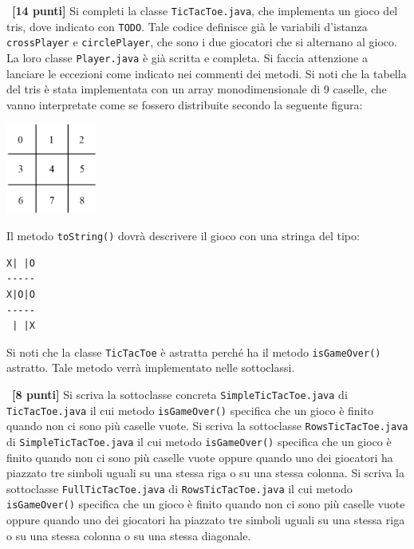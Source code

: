 \documentclass[12pt]{article}
\newcounter{esnu}
\newenvironment{esercizio}{\medskip \noindent {\bf Esercizio\addtocounter{esnu}{1} \arabic{esnu}}}{}
\begin{document}
\begin{esercizio}~\textbf{[14 punti]}
  Si completi la classe \texttt{TicTacToe.java}, che implementa un gioco
  del tris, dove indicato con \texttt{TODO}. Tale codice definisce gi\`a le
  variabili d'istanza \texttt{crossPlayer} e \texttt{circlePlayer}, che sono
  i due giocatori che si alternano al gioco. La loro classe \texttt{Player.java}
  \`e gi\`a scritta e completa. Si faccia attenzione a lanciare le
  eccezioni come indicato nei commenti dei metodi. Si noti che la
  tabella del tris \`e stata implementata con un array monodimensionale di
  9 caselle, che vanno interpretate come se fossero distribuite secondo
  la seguente figura:
%
  \begin{center}
    \includegraphics[width=3cm]{tictactoe_grid_linear.png}
  \end{center}
%
  Il metodo \texttt{toString()} dovr\`a descrivere il gioco con una
  stringa del tipo:
\begin{center}
\begin{verbatim}
X| |O
-----
X|O|O
-----
 | |X
\end{verbatim}
\end{center}
%
  Si noti che la classe \texttt{TicTacToe} \`e astratta perch\'e ha
  il metodo \texttt{isGameOver()} astratto. Tale metodo verr\`a implementato
  nelle sottoclassi.
\end{esercizio}

\begin{esercizio}~\textbf{[8 punti]}
  Si scriva la sottoclasse concreta \texttt{SimpleTicTacToe.java} di
  \texttt{TicTacToe.java} il cui metodo
  \texttt{isGameOver()} specifica che un gioco \`e finito quando
  non ci sono pi\`u caselle vuote.
  Si scriva la sottoclasse \texttt{RowsTicTacToe.java} di
  \texttt{SimpleTicTacToe.java} il cui metodo
  \texttt{isGameOver()} specifica che un gioco \`e finito quando
  non ci sono pi\`u caselle vuote oppure quando uno dei giocatori ha
  piazzato tre simboli uguali su una stessa riga o su una stessa colonna.
  Si scriva la sottoclasse \texttt{FullTicTacToe.java} di
  \texttt{RowsTicTacToe.java} il cui metodo
  \texttt{isGameOver()} specifica che un gioco \`e finito quando
  non ci sono pi\`u caselle vuote oppure quando uno dei giocatori ha
  piazzato tre simboli uguali su una stessa riga o su una stessa colonna
  o su una stessa diagonale.
\end{esercizio}
\end{document}
